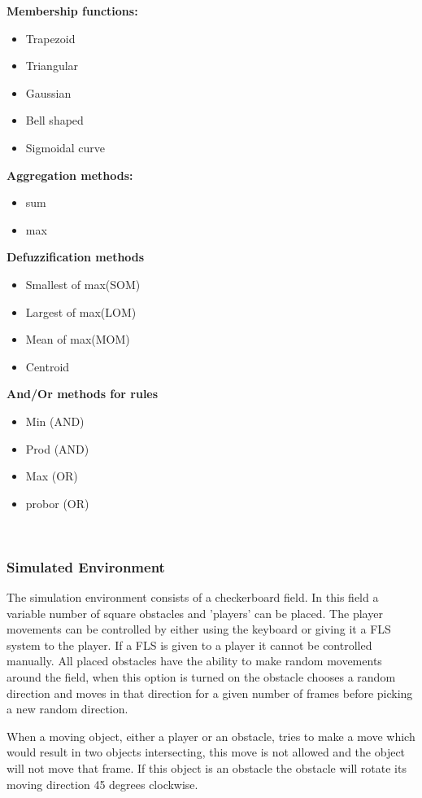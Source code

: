 \documentclass[conference]{IEEEtran}
\begin{document}
\textbf{Membership functions:}
\begin{itemize}
  \item Trapezoid
  \item Triangular
  \item Gaussian
  \item Bell shaped
  \item Sigmoidal curve
\end{itemize}

\textbf{Aggregation methods:}
\begin{itemize}
  \item sum
  \item max
\end{itemize}

\textbf{Defuzzification methods}
\begin{itemize}
  \item Smallest of max(SOM)
  \item Largest of max(LOM)
  \item Mean of max(MOM)
  \item Centroid
\end{itemize}

\textbf{And/Or methods for rules}
\begin{itemize}
  \item Min (AND)
  \item Prod (AND)
  \item Max (OR)
  \item probor (OR)
\end{itemize}

\hfill\\
\subsubsection*{Simulated Environment}
The simulation environment consists of a checkerboard field. In this field a variable number of square obstacles and 'players' can be placed. The player movements can be controlled by either using the keyboard or giving it a FLS system to the player. If a FLS is given to a player it cannot be controlled manually.
All placed obstacles have the ability to make random movements around the field, when this option is turned on the obstacle chooses a random direction and moves in that direction for a given number of frames before picking a new random direction.

When a moving object, either a player or an obstacle, tries to make a move which would result in two objects intersecting, this move is not allowed and the object will not move that frame. If this object is an obstacle the obstacle will rotate its moving direction 45 degrees clockwise.
\end{document}
